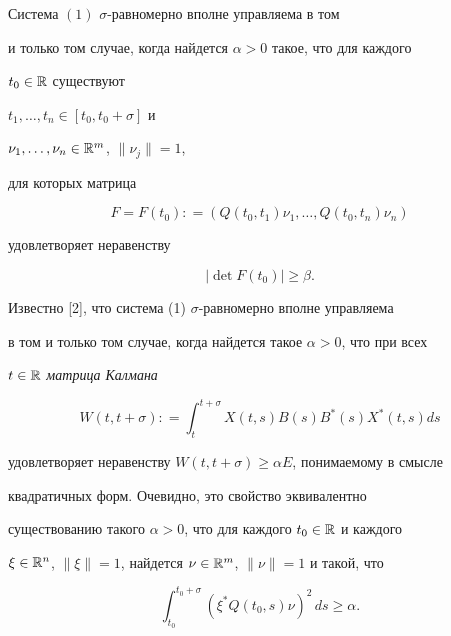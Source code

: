 







\begin{lem} Система $(1)$ $\sigma$-равномерно вполне управляема в том


и только том случае, когда найдется $\alpha>0$ такое, что для каждого


$t_0\in\Bbb R$ существуют


$t_{1},\dotsc,t_{n}\in [t_{0},t_{0}+\sigma]$ и


$\nu_{1},\dotsc,\nu_{n}\in\Bbb R^m$, $\|\nu_{j}\|=1$,


для которых матрица


\begin{equation}


F=F(t_0): =(Q(t_0,t_1)\nu_1,\dotsc,Q(t_0,t_n)\nu_n)


\end{equation}


удовлетворяет неравенству


\begin{equation}


|\det F(t_0)|\ge\beta.


\end{equation}


\end{lem}





\begin{note}


Известно [2], что система (1) $\sigma$-равномерно вполне управляема


в том и только том случае, когда найдется такое $\alpha>0$, что при всех


$t\in\Bbb R$ {\it матрица Калмана}


$$


W(t,t+\sigma): =\int_{t}^{t+\sigma}X(t,s)B(s)B^*(s)X^*(t,s)ds


$$


удовлетворяет неравенству $W(t,t+\sigma)\ge \alpha E$, понимаемому в смысле


квадратичных форм. Очевидно, это свойство эквивалентно


существованию такого $\alpha>0$, что для каждого $t_0\in\Bbb R$ и каждого


$\xi\in\Bbb R^n$, $\|\xi\|=1$, найдется $\nu\in\Bbb R^m$, $\|\nu\|=1$ и такой, что


\begin{equation}


\int_{t_0}^{t_0+\sigma}(\xi^*Q(t_0,s)\nu)^2\,ds\ge\alpha.


\end{equation}


\end{note}





